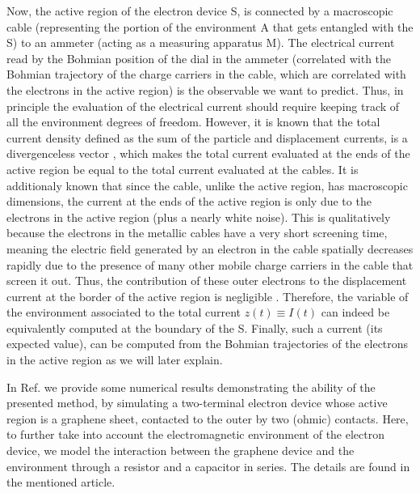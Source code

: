 \documentclass[11pt, a4paper]{article} %
\begin{document}
Now, the active region of the electron device S, is connected by a macroscopic cable (representing the portion of the environment A that gets entangled with the S) to an ammeter (acting as a measuring apparatus M). The electrical current read by the Bohmian position of the dial in the ammeter (correlated with the Bohmian trajectory of the charge carriers in the cable, which are correlated with the electrons in the active region) is the observable we want to predict. Thus, in principle the evaluation of the electrical current should require keeping track of all the environment degrees of freedom. However, it is known that the total current density defined as the sum of the particle and displacement currents, is a divergenceless vector \cite{diver1, diver2}, which makes the total current evaluated at the ends of the active region be equal to the total current evaluated at the cables. It is additionaly known \cite{equiv} that since the cable, unlike the active region, has macroscopic dimensions, the current at the ends of the active region is only due to the electrons in the active region (plus a nearly white noise). This is qualitatively because the electrons in the metallic cables have a very short screening time, meaning the electric field generated by an electron in the cable spatially decreases rapidly due to the presence of many other mobile charge carriers in the cable that screen it out. Thus, the contribution of these outer electrons to the displacement current at the border of the active region is negligible \cite{neg}. Therefore, the variable of the environment associated to the total current $z(t)\equiv I(t)$ can indeed be equivalently computed at the boundary of the S. Finally, such a current (its expected value), can be computed from the Bohmian trajectories of the electrons in the active region as we will later explain. 

In Ref. \cite{Thz} we provide some numerical results demonstrating the ability of the presented method, by simulating a two-terminal electron device whose active region is a graphene sheet, contacted to the outer by two (ohmic) contacts. Here, to further take into account the electromagnetic environment of the electron device, we model the interaction between the graphene device and the environment through a resistor and a capacitor in series. The details are found in the mentioned article. 
\end{document}
